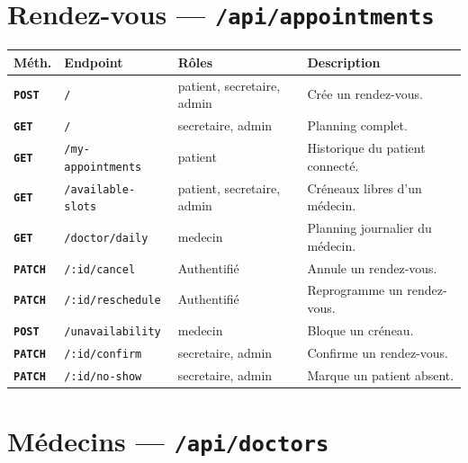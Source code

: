 \documentclass[12pt,a4paper]{report}
\newcommand{\method}[1]{\texttt{\textcolor{MedTealDark}{\bfseries#1}}}
\begin{document}
\section{Rendez-vous — \texttt{/api/appointments}}

\begin{center}
\small
\begin{tabular}{@{} l p{4.5cm} p{3.8cm} p{4.5cm} @{}}
  \toprule
  \textbf{Méth.} & \textbf{Endpoint} & \textbf{Rôles} & \textbf{Description} \\
  \midrule
  \method{POST}  & \texttt{/}                  & patient, secretaire, admin & Crée un rendez-vous. \\
  \method{GET}   & \texttt{/}                  & secretaire, admin          & Planning complet. \\
  \method{GET}   & \texttt{/my-appointments}   & patient                    & Historique du patient connecté. \\
  \method{GET}   & \texttt{/available-slots}   & patient, secretaire, admin & Créneaux libres d'un médecin. \\
  \method{GET}   & \texttt{/doctor/daily}      & medecin                    & Planning journalier du médecin. \\
  \method{PATCH} & \texttt{/:id/cancel}        & Authentifié                & Annule un rendez-vous. \\
  \method{PATCH} & \texttt{/:id/reschedule}    & Authentifié                & Reprogramme un rendez-vous. \\
  \method{POST}  & \texttt{/unavailability}    & medecin                    & Bloque un créneau. \\
  \method{PATCH} & \texttt{/:id/confirm}       & secretaire, admin          & Confirme un rendez-vous. \\
  \method{PATCH} & \texttt{/:id/no-show}       & secretaire, admin          & Marque un patient absent. \\
  \bottomrule
\end{tabular}
\end{center}

\section{Médecins — \texttt{/api/doctors}}
\end{document}
